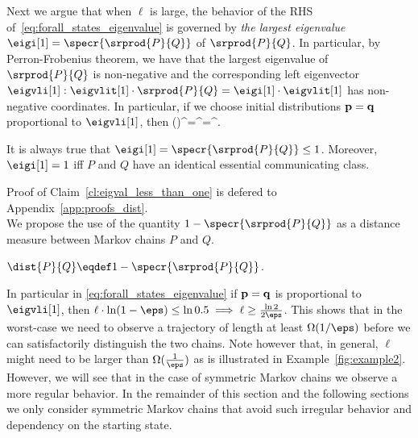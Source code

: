 Next we argue that when $\ell$ is large, the behavior of the RHS of~\eqref{eq:forall_states_eigenvalue} is governed by {\em the largest eigenvalue} 
$\eigi[1]=\specr{\srprod{P}{Q}}$ of $\srprod{P}{Q}$. 
In particular, by Perron-Frobenius theorem, we have that the largest eigenvalue of $\srprod{P}{Q}$ is non-negative and 
the corresponding left eigenvector $\eigvli[1]: \eigvlit[1]\circ\srprod{P}{Q}=\eigi[1]\cdot\eigvlit[1]$ 
has non-negative coordinates. In particular, if we choose initial distributions $\mathbf{p} = \mathbf{q}$ proportional to $\eigvli[1]$, then
\be
{}\circ\left(\right)^{\ell}\circ\onev=\eigi[1]^\ell\cdot{}=\eigi[1]^\ell.
\label{eq:largest_eigenvalue}
\ee

\begin{claim}
It is always true that $\eigi[1]=\specr{\srprod{P}{Q}}\le 1$. Moreover, $\eigi[1]=1$ iff $P$ and $Q$ have an identical essential communicating class.
\label{cl:eigval_less_than_one}
\end{claim} 
Proof of Claim~\ref{cl:eigval_less_than_one} is defered to Appendix~\ref{app:proofs_dist}.\\

We propose the use of the quantity $1-\specr{\srprod{P}{Q}}$ as a distance measure between Markov chains $P$ and $Q$. 
\begin{description}
\label{def:distance}
\item[Definition:] $\dist{P}{Q} \eqdef 1-\specr{\srprod{P}{Q}}$.
\end{description}
In particular in \eqref{eq:forall_states_eigenvalue} if $\mathbf{p} = \mathbf{q}$ is proportional to $\eigvli[1]$, then 
$\ell\cdot\ln(1-\eps)\le\ln 0.5\implies\ell\ge\frac{\ln 2}{2\eps}$. This shows that in the worst-case we need to observe a trajectory of length at least $\Omega(1/\eps)$  before we can satisfactorily distinguish the two chains.
Note however that, in general, $\ell$ might need to be larger than 
$\Omega(\frac{1}{\eps})$ as is illustrated in Example~\ref{fig:example2}. However, we will see that in the case of symmetric Markov chains we observe a more regular behavior.
In the remainder of this section and the following sections we only consider symmetric Markov chains that avoid such irregular behavior and 
dependency on the starting state.



